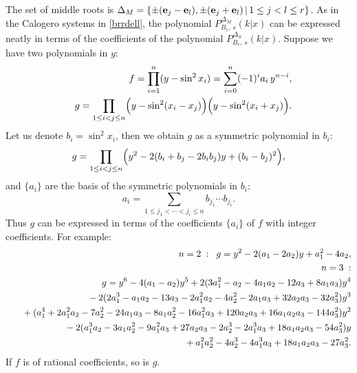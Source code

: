 \documentclass[a4paper,12pt]{article}
\begin{document}
The set of middle roots is $\Delta_M=\{\pm({\bf e}_j-{\bf e}_l),
\pm({\bf e}_j+{\bf e}_l)\,|\,1\leq j<l\leq r\}$.
As in the Calogero systems in \ref{brrdell}, the polynomial
$P_{B_r,\, s}^{\Delta_M}(k|x)$ can be expressed neatly in terms of
the coefficients of the polynomial $P_{B_r,\,s}^{\Delta_S}(k|x)$.
Suppose we have two polynomials in $y$:
\begin{eqnarray}
    &&f=\prod_{i=1}^n(y-\sin^2x_i)=\sum_{i=0}^n(-1)^ia_i\,y^{n-i},\\
%
    &&g=\prod_{1\leq i<j\leq n}
    \Bigl(y-\sin^2(x_i-x_j)\Bigr)\Bigl(y-\sin^2(x_i+x_j)\Bigr).
\end{eqnarray}
Let us denote $b_i=\sin^2x_i$, then we obtain $g$ as a symmetric polynomial
in $b_i$:
\begin{equation}
   g=\prod_{1\leq i<j\leq n}\Bigl(y^2-2(b_i+b_j-2b_ib_j)y+(b_i-b_j)^2\Bigr),
\end{equation}
and $\{a_i\}$ are the basis of the  symmetric polynomials in $b_i$:
\begin{equation}
   a_i=\sum_{1\leq j_1<\cdots<j_i\leq n}b_{j_1}\cdots b_{j_i}.
\end{equation}
Thus $g$ can be expressed in terms of the coefficients $\{a_i\}$ of $f$
with integer coefficients. For example:
\begin{eqnarray}
   &&\hspace{-5mm}n=2\;:\;\;g=y^2-2(a_1-2a_2)y+a_1^2-4a_2,
   \label{tfgrel1}\\
%
   &&\hspace{-5mm}n=3\;:\nonumber\\
   &&\hspace{-5mm}\;\;
   g=y^6-4(a_1-a_2)y^5+2(3a_1^2-a_2-4a_1a_2-12a_3+8a_1a_3)y^4\nonumber\\
   &&\hspace{-5mm}\;\;\phantom{g=}
   -2(2a_1^3-a_1a_2-13a_3-2a_1^2a_2-4a_2^2-2a_1a_3+32a_2a_3-32a_3^2)y^3
   \nonumber\\
   &&\hspace{-5mm}\;\;\phantom{g=} +(a_1^4+2a_1^2a_2-7a_2^2-24a_1a_3
   -8a_1a_2^2-16a_1^2a_3+120a_2a_3+16a_1a_2a_3-144a_3^2)y^2\nonumber\\
   &&\hspace{-5mm}\;\;\phantom{g=}
   -2(a_1^3a_2-3a_1a_2^2-9a_1^2a_3+27a_2a_3-2a_2^3-2a_1^3a_3+18a_1a_2a_3
   -54a_3^2)y\nonumber\\
   &&\hspace{-5mm}\;\;\phantom{g=}
   +a_1^2a_2^2-4a_2^3-4a_1^3a_3+18a_1a_2a_3-27a_3^2.
   \label{tfgrel2}
\end{eqnarray}
If $f$ is of rational coefficients, so is $g$. 
\end{document}
